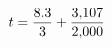 \documentclass[preview]{standalone}
\begin{document}
\begin{align*}
t = { 8.3 \over 3 } + { 3{,}107 \over 2{,}000 }
\end{align*}
\end{document}
